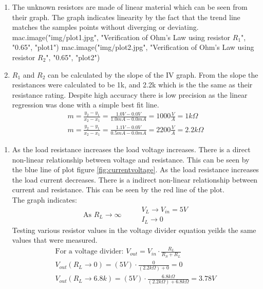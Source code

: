 {%

{%
{%
\begin{enumerate}
  \item The unknown resistors are made of linear material which can be seen from their graph.
  The graph indicates linearity by the fact that the trend line matches the
  samples points without diverging or deviating.
  {{ mac.image("img/plot1.jpg", "Verification of Ohm's Law using resistor $R_1$", "0.65", "plot1")}}
  {{ mac.image("img/plot2.jpg", "Verification of Ohm's Law using resistor $R_2$", "0.65", "plot2")}}
  \item $R_1$ and $R_2$ can be calculated by the slope of the IV graph.
  From the slope the resistances were calculated to be 1k, and 2.2k which is the
  the same as their resistance rating. Despite high accuracy there is low precision as
  the linear regression was done with a simple best fit line.
  \begin{gather}
    m = \frac{y_2-y_1}{x_2-x_1} = \frac{1.0 V - 0.0 V}{1.0 mA - 0.0 mA} = 1000 \frac{V}{A} = 1 k \Omega \\
    m = \frac{y_2-y_1}{x_2-x_1} = \frac{1.1 V - 0.0 V}{0.5 mA - 0.0 mA} = 2200 \frac{V}{A} = 2.2 k \Omega
  \end{gather}
\end{enumerate}
{%

{%
\newpage
\begin{enumerate}
  \item As the load resistance increases the load voltage increases.
  There is a direct non-linear relationship between voltage and resistance. This can be seen by the blue line of plot
  figure \ref{fig:currentvoltage}. As the load resistance increases the load current decreases.
  There is a indirect non-linear relationship between current and resistance. This can be seen by the red line of the plot.\\
  The graph indicates:
  \begin{equation}
    \text{ As } R_L \to \infty \hspace{1cm} \begin{matrix}
    V_L \to V_{in} = 5 V \\
    I_L \to 0
  \end{matrix}
  \end{equation}
  Testing various resistor values in the voltage divider equation yeilds the same
  values that were measured.
  \begin{gather}
    \text{For a voltage divider: } V_{out} = V_{in} \cdot \frac{R_L}{R_S+R_L} \\
    V_{out}(R_L \to 0) = (5 V) \cdot \frac{0}{(2.2 k \Omega)+0} = 0 \\
    V_{out}(R_L \to 6.8k ) = (5 V) \cdot \frac{6.8 k \Omega}{(2.2 k \Omega)+ 6.8 k \Omega} = 3.78V
  \end{gather}




\end{enumerate}}}}}}
